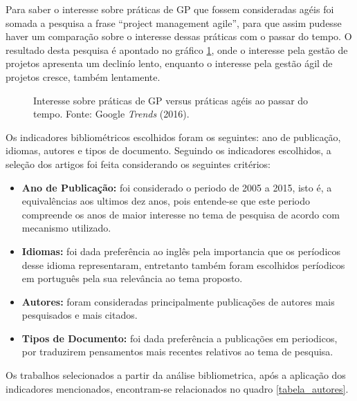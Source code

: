 Para saber o interesse sobre práticas de GP que fossem consideradas agéis foi somada a pesquisa a frase ``project management agile'', para que assim pudesse haver um comparação sobre o interesse dessas práticas com o passar do tempo. O resultado desta pesquisa é apontado no gráfico \ref{trends2}, onde o interesse pela gestão de projetos apresenta um declinío lento, enquanto o interesse pela gestão ágil de projetos cresce, também lentamente.

\begin{figure}[!ht]
  \centering
  \caption{Interesse sobre práticas de GP versus práticas agéis ao passar do tempo. Fonte: Google \textit{Trends} (2016).}
  \label{trends2}
\end{figure}


Os indicadores bibliométricos escolhidos foram os seguintes: ano de publicação, idiomas, autores e tipos de documento. Seguindo os indicadores escolhidos, a seleção dos artigos foi feita considerando os seguintes critérios:

\begin{itemize}
  \item \textbf{Ano de Publicação:} foi considerado o periodo de 2005 a 2015, isto é, a equivalências aos ultimos dez anos, pois entende-se que este periodo compreende os anos de maior interesse no tema de pesquisa de acordo com mecanismo utilizado.
  \item \textbf{Idiomas:} foi dada preferência ao inglês pela importancia que os períodicos desse idioma representaram, entretanto também foram escolhidos períodicos em português pela sua relevância ao tema proposto.
  \item \textbf{Autores:} foram consideradas principalmente publicações de autores mais pesquisados e mais citados.
  \item \textbf{Tipos de Documento:} foi dada preferência a publicações em periodicos, por traduzirem pensamentos mais recentes relativos ao tema de pesquisa.
\end{itemize}


Os trabalhos selecionados a partir da análise bibliometrica, após a aplicação dos indicadores mencionados, encontram-se relacionados no quadro \ref{tabela_autores}.

